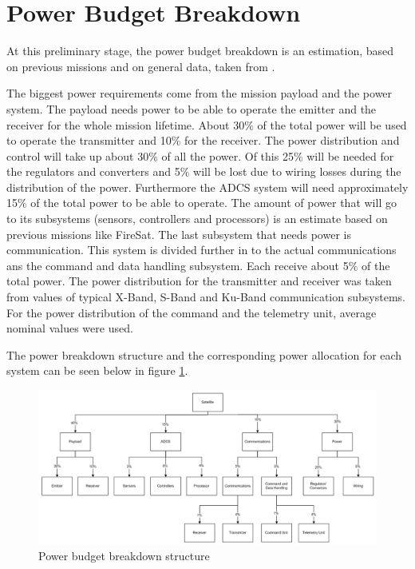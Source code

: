 \section{Power Budget Breakdown}
\label{blBudgetPower}

At this preliminary stage, the power budget breakdown is an estimation, based on previous missions and on general data, taken from \cite{larson}.

The biggest power requirements come from the mission payload and the power system. The payload needs power to be able to operate the emitter
and the receiver for the whole mission lifetime. About 30$\%$ of the total power will be used to operate the transmitter and 10$\%$ for the receiver. The power distribution and control will take up about 30$\%$ of all the power. Of this 25$\%$ will be needed for the regulators and converters and 5$\%$ will be lost due to wiring losses during the distribution of the power.
Furthermore the ADCS system will need approximately 15$\%$ of the total power to be able to operate. The amount of power that will go to its subsystems (sensors, controllers and processors) is an estimate based on previous missions like FireSat\cite{larson}.
The last subsystem that needs power is communication. This system is divided further in to the actual communications ans the command and data handling subsystem. Each receive about 5$\%$ of the total power.
The power distribution for the transmitter and receiver was taken from values of typical X-Band, S-Band and Ku-Band communication subsystems.
For the power distribution of the command and the telemetry unit, average nominal values were used\cite{larson}.

The power breakdown structure and the corresponding power allocation for each system can be seen below in figure \ref{fig:powerbudget}.

\begin{figure}
\centering
\includegraphics[width=1.0\textwidth, angle=90]{chapters/img/Power_budget_breakdown.jpg}
\caption{Power budget breakdown structure}
\label{fig:powerbudget}
\end{figure}